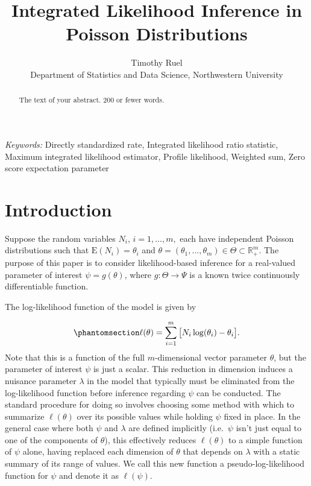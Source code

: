 \documentclass[
  12pt]{article}
\begin{document}
\def\spacingset#1{\renewcommand{\baselinestretch}%
{#1}\small\normalsize} \spacingset{1}



\title{\bf Integrated Likelihood Inference in Poisson Distributions}
\author{
Timothy Ruel\\
Department of Statistics and Data Science, Northwestern University\\
}
\maketitle

\bigskip
\bigskip
\begin{abstract}
The text of your abstract. 200 or fewer words.
\end{abstract}

\noindent%
{\it Keywords:} Directly standardized rate, Integrated likelihood ratio
statistic, Maximum integrated likelihood estimator, Profile
likelihood, Weighted sum, Zero score expectation parameter
\vfill

\newpage
\spacingset{1.9} %

\section{Introduction}\label{sec-intro}

Suppose the random variables \(N_i\), \(i = 1, ..., m,\) each have
independent Poisson distributions such that \(\text{E}(N_i) = \theta_i\)
and
\(\theta = (\theta_1, ..., \theta_m) \in \Theta \subset \mathbb{R}^m_+\).
The purpose of this paper is to consider likelihood-based inference for
a real-valued parameter of interest \(\psi = g(\theta)\), where
\(g: \Theta \to \Psi\) is a known twice continuously differentiable
function.

The log-likelihood function of the model is given by

\begin{equation}\phantomsection\label{eq-1}{
\ell(\theta) = \sum_{i=1}^m \big[N_i \log(\theta_i) - \theta_i\big].
}\end{equation} Note that this is a function of the full
\(m\)-dimensional vector parameter \(\theta\), but the parameter of
interest \(\psi\) is just a scalar. This reduction in dimension induces
a nuisance parameter \(\lambda\) in the model that typically must be
eliminated from the log-likelihood function before inference regarding
\(\psi\) can be conducted. The standard procedure for doing so involves
choosing some method with which to summarize \(\ell(\theta)\) over its
possible values while holding \(\psi\) fixed in place. In the general
case where both \(\psi\) and \(\lambda\) are defined implicitly
(i.e.~\(\psi\) isn't just equal to one of the components of \(\theta\)),
this effectively reduces \(\ell(\theta)\) to a simple function of
\(\psi\) alone, having replaced each dimension of \(\theta\) that
depends on \(\lambda\) with a static summary of its range of values. We
call this new function a pseudo-log-likelihood function for \(\psi\) and
denote it as \(\ell(\psi)\).
\end{document}
